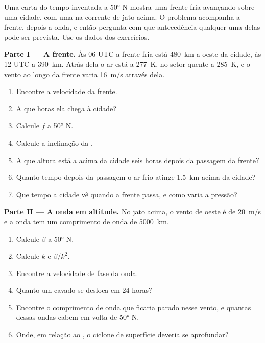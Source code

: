 \begin{problem}\label{pb:b2:weather-systems:1}
Uma carta do tempo inventada a \ang{50} N mostra uma frente fria avançando sobre uma cidade, com uma  na corrente de jato acima. O problema acompanha a frente, depois a onda, e então pergunta com que
antecedência qualquer uma delas pode ser prevista. Use os dados dos exercícios.

\medskip\noindent\textbf{Parte I --- A frente.}
Às 06 UTC a frente fria está \qty{480}{km} a oeste da cidade, às 12 UTC a \qty{390}{km}. Atrás dela
o ar está a \qty{277}{K}, no setor quente a \qty{285}{K}, e o vento ao longo da frente
varia \qty{16}{m/s} através dela.
\begin{enumerate}
  \item Encontre a velocidade da frente.
  \item A que horas ela chega à cidade?
  \item Calcule $f$ a \ang{50} N.
  \item Calcule a inclinação da .
  \item A que altura está a  acima da cidade seis horas depois da passagem da frente?
  \item Quanto tempo depois da passagem o ar frio atinge \qty{1.5}{km} acima da cidade?
  \item Que tempo a cidade vê quando a frente passa, e como varia a pressão?
\end{enumerate}

\medskip\noindent\textbf{Parte II --- A onda em altitude.}
No jato acima, o vento de oeste é de \qty{20}{m/s} e a onda tem um comprimento de onda de \qty{5000}{km}.
\begin{enumerate}[resume]
  \item Calcule $\beta$ a \ang{50} N.
  \item Calcule $k$ e $\beta/k^2$.
  \item Encontre a velocidade de fase da onda.
  \item Quanto um cavado se desloca em 24 horas?
  \item Encontre o comprimento de onda que ficaria parado nesse vento, e quantas dessas ondas cabem
        em volta de \ang{50} N.
  \item Onde, em relação ao , o ciclone de superfície deveria se aprofundar?
\end{enumerate}


\end{problem}
